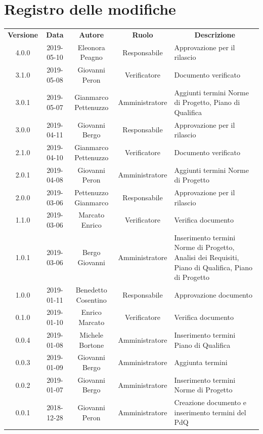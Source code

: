 \renewcommand {\footrulewidth}{0.2mm}

\usepackage{lipsum}

	
	{\def\arraystretch{2}\tabcolsep=10pt
	\newpage
	\section*{\centering Registro delle modifiche}
	\begin{tabularx}{\textwidth}{ c | c | c | c | X }
		\rowcolor{LightBlue}
		\color{white}\bfseries Versione & \color{white}\bfseries Data & \color{white}\bfseries Autore & \color{white}\bfseries Ruolo & \multicolumn{1}{c}{\color{white}\bfseries Descrizione}\\[0.25cm]
		4.0.0 & 2019-05-10 & Eleonora Peagno & Responsabile & Approvazione per il rilascio \\ 
		\hline
		3.1.0 & 2019-05-08 & Giovanni Peron & Verificatore & Documento verificato \\ 
		\hline
		3.0.1 & 2019-05-07 & Gianmarco Pettenuzzo & Amministratore & Aggiunti termini Norme di Progetto, Piano di Qualifica \\ \hline 
		3.0.0 & 2019-04-11 & Giovanni Bergo & Responsabile & Approvazione per il rilascio \\ 
		\hline
		2.1.0 & 2019-04-10 & Gianmarco Pettenuzzo & Verificatore & Documento verificato \\ 
		\hline
		2.0.1 & 2019-04-08 & Giovanni Peron & Amministratore & Aggiunti termini Norme di Progetto \\ 
		\hline
		2.0.0 & 2019-03-06 & Pettenuzzo Gianmarco & Responsabile & Approvazione per il rilascio \\ 
		\hline
		1.1.0 & 2019-03-06 & Marcato Enrico & Verificatore & Verifica documento \\ 
		\hline
		1.0.1 & 2019-03-06 & Bergo Giovanni & Amministratore & Inserimento termini Norme di Progetto, Analisi dei Requisiti, Piano di Qualifica, Piano di Progetto \\ 
		\hline
		1.0.0 & 2019-01-11 & Benedetto Cosentino & Responsabile & Approvazione documento \\ 
		\hline
		0.1.0 & 2019-01-10 & Enrico Marcato & Verificatore & Verifica documento \\ 
		\hline
		0.0.4 & 2019-01-08 & Michele Bortone & Amministratore & Inserimento termini Piano di Qualifica \\ 
		\hline 
		0.0.3 & 2019-01-09 & Giovanni Bergo & Amministratore & Aggiunta termini \\ 
		\hline 
		0.0.2 & 2019-01-07 & Giovanni Bergo & Amministratore & Inserimento termini Norme di Progetto \\ 
		\hline 
		0.0.1 & 2018-12-28 & Giovanni Peron & Amministratore & Creazione documento e \newline inserimento termini del PdQ \\ 
		\hline
		

\end{tabularx}}
